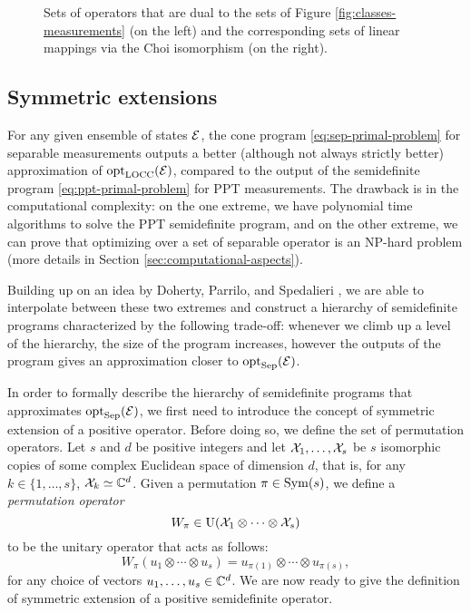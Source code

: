 \begin{figure}[!ht]
  \centering
    \begin{minipage}{0.5\textwidth}
      \centering
      \def\svgwidth{200pt}
      \scalebox{.75}{}
    \end{minipage}\hfill
    \begin{minipage}{0.5\textwidth}
      \centering
      \def\svgwidth{200pt}
      \scalebox{.75}{}
    \end{minipage}
    \caption{Sets of operators that are dual to the sets of Figure 
    \ref{fig:classes-measurements} (on the left) and the 
    corresponding sets of linear mappings via the Choi isomorphism (on the right).}
    \label{fig:measurements-dual}
\end{figure}

\subsection{Symmetric extensions}
\label{sec:symm-ext}
For any given ensemble of states $\mathcal{E}$, the cone program \eqref{eq:sep-primal-problem}
for separable measurements outputs a better (although not always strictly better) 
approximation of $\operatorname{opt}_{\mathrm{LOCC}}(\mathcal{E})$, compared to the output of the semidefinite 
program \eqref{eq:ppt-primal-problem} for PPT measurements.
The drawback is in the computational complexity: on the one extreme, we have 
polynomial time algorithms to solve the PPT semidefinite program, and on the other 
extreme, we can prove that optimizing over a set of separable operator is an NP-hard 
problem (more details in Section \ref{sec:computational-aspects}).

Building up on an idea by Doherty, Parrilo, and Spedalieri \cite{Doherty02,Doherty04}, 
we are able to interpolate between these two extremes and construct a hierarchy of
semidefinite programs characterized by the following trade-off: whenever we 
climb up a level of the hierarchy, the size of the program increases, however the
outputs of the program gives an approximation closer to $\operatorname{opt}_{\mathrm{Sep}}(\mathcal{E})$.

In order to formally describe the hierarchy of semidefinite programs that 
approximates $\operatorname{opt}_{\mathrm{Sep}}(\mathcal{E})$, we first need to introduce the concept of 
symmetric extension of a positive operator.
Before doing so, we define the set of permutation operators.
Let $s$ and $d$ be positive integers and let $\mathcal{X}_{1}, \ldots, \mathcal{X}_{s}$ be $s$ isomorphic 
copies of some complex Euclidean space of dimension $d$, that is, 
for any $k \in \{1, \ldots, s \}$, $\mathcal{X}_{k} \simeq \mathbb{C}^{d}$. 
Given a permutation $\pi\in\mathrm{Sym}(s)$, we define
a \emph{permutation operator} 
\begin{equation}
  W_{\pi} \in \mathrm{U}(\mathcal{X}_{1}\otimes\cdots\otimes\mathcal{X}_{s})
\end{equation}
to be the unitary operator that acts as follows:
\begin{equation}
  W_{\pi}(u_{1}\otimes\cdots\otimes u_{s}) = u_{\pi(1)}\otimes\cdots
    \otimes u_{\pi(s)},
\end{equation}
for any choice of vectors $u_{1}, \ldots, u_{s}\in\mathbb{C}^{d}$.
We are now ready to give the definition of symmetric extension of a positive 
semidefinite operator. 

